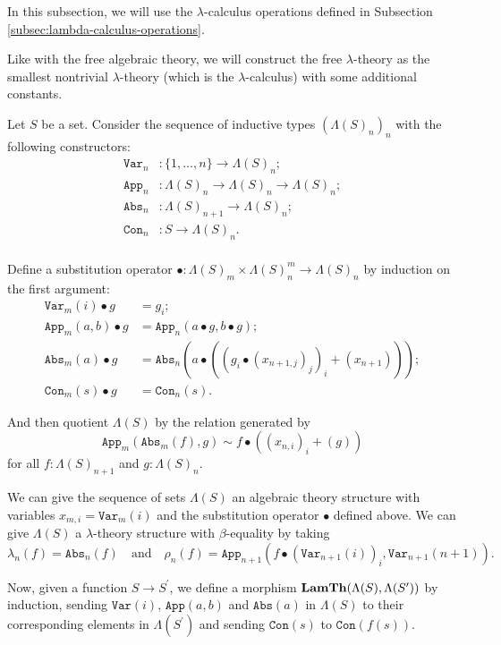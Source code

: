 In this subsection, we will use the $ \lambda $-calculus operations defined in Subsection \ref{subsec:lambda-calculus-operations}.

Like with the free algebraic theory, we will construct the free $ \lambda $-theory as the smallest nontrivial $ \lambda $-theory (which is the $ \lambda $-calculus) with some additional constants.

Let $ S $ be a set. Consider the sequence of inductive types $ (\Lambda(S)_n)_n $ with the following constructors:
\begin{align*}
  \mathtt{Var}_n &: \{ 1, \dots, n \} \to \Lambda(S)_n;\\
  \mathtt{App}_n &: \Lambda(S)_n \to \Lambda(S)_n \to \Lambda(S)_n;\\
  \mathtt{Abs}_n &: \Lambda(S)_{n + 1} \to \Lambda(S)_n;\\
  \mathtt{Con}_n &: S \to \Lambda(S)_n.\\
\end{align*}

Define a substitution operator $ \bullet: \Lambda(S)_m \times \Lambda(S)_n^m \to \Lambda(S)_n $ by induction on the first argument:
\begin{align*}
  \mathtt{Var}_m(i) \bullet g &= g_i;\\
  \mathtt{App}_m(a, b) \bullet g &= \mathtt{App}_n(a \bullet g, b \bullet g);\\
  \mathtt{Abs}_m(a) \bullet g &= \mathtt{Abs}_n(a \bullet ((g_i \bullet (x_{n + 1, j})_j)_i + (x_{n + 1})));\\
  \mathtt{Con}_m(s) \bullet g &= \mathtt{Con}_n(s).
\end{align*}

And then quotient $ \Lambda(S) $ by the relation generated by
\[ \mathtt{App}_m(\mathtt{Abs}_m(f), g) \sim f \bullet ((x_{n, i})_i + (g)) \]
for all $ f: \Lambda(S)_{n + 1} $ and $ g: \Lambda(S)_n $.

\begin{example}\label{ex:free-lambda-theory}
  We can give the sequence of sets $ \Lambda(S) $ an algebraic theory structure with variables $ x_{m, i} = \mathtt{Var}_m(i) $ and the substitution operator $ \bullet $ defined above. We can give $ \Lambda(S) $ a $ \lambda $-theory structure with $ \beta $-equality by taking
  \[ \lambda_n(f) = \mathtt{Abs}_n(f) \quad \text{and} \quad \rho_n(f) = \mathtt{App}_{n + 1}(f \bullet (\mathtt{Var}_{n + 1}(i))_i, \mathtt{Var}_{n + 1}(n + 1)). \]

  Now, given a function $ S \to S^\prime $, we define a morphism $ \mathbf{LamTh}(\Lambda(S), \Lambda(S^\prime)) $ by induction, sending $ \mathtt{Var}(i) $, $ \mathtt{App}(a, b) $ and $ \mathtt{Abs}(a) $ in $ \Lambda(S) $ to their corresponding elements in $ \Lambda(S^\prime) $ and sending $ \mathtt{Con}(s) $ to $ \mathtt{Con}(f(s)) $.
\end{example}

